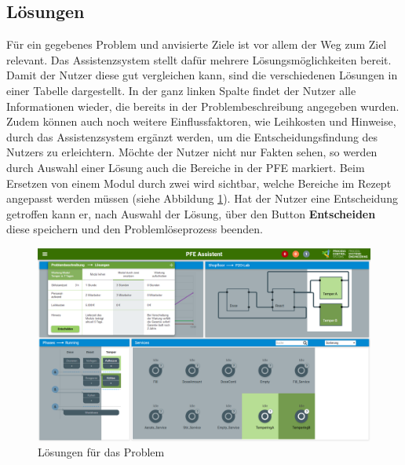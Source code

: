\subsection{Lösungen}
\label{4:pD-Loesungen}
Für ein gegebenes Problem und anvisierte Ziele ist vor allem der Weg zum Ziel relevant. Das Assistenzsystem stellt dafür mehrere Lösungsmöglichkeiten bereit. Damit der Nutzer diese gut vergleichen kann, sind die verschiedenen Lösungen in einer Tabelle dargestellt. In der ganz linken Spalte findet der Nutzer alle Informationen wieder, die bereits in der Problembeschreibung angegeben wurden. Zudem können auch noch weitere Einflussfaktoren, wie Leihkosten und Hinweise, durch das Assistenzsystem ergänzt werden, um die Entscheidungsfindung des Nutzers zu erleichtern. Möchte der Nutzer nicht nur Fakten sehen, so werden durch Auswahl einer Lösung auch die Bereiche in der PFE markiert. Beim Ersetzen von einem Modul durch zwei wird sichtbar, welche Bereiche im Rezept angepasst werden müssen (siehe Abbildung \ref{pic:pD-Loesungen}). Hat der Nutzer eine Entscheidung getroffen kann er, nach Auswahl der Lösung, über den Button \textbf{Entscheiden} diese speichern und den Problemlöseprozess beenden.
\begin{figure}[htbp]
\centering
\includegraphics[angle=90,scale=0.47]{DA_files/Bilder/Konzept/Skizze-Loesungen-PFE.png}
\caption{Lösungen für das Problem}
\label{pic:pD-Loesungen}
\end{figure}


